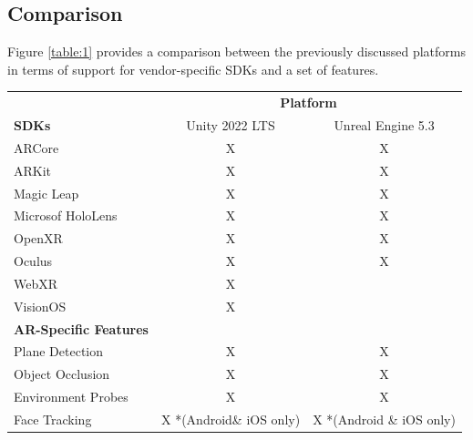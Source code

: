 \documentclass{vgtc}                          %
\begin{document}
\subsection{Comparison}
Figure \ref{table:1} provides a comparison between the previously discussed
platforms in terms of support for vendor-specific SDKs and a set of features.
\begin{table}
	\centering

	\begin{tabular}{l c c}
		\toprule
		                              & \multicolumn{2}{c}{\textbf{Platform}}                            \\
		\cmidrule(l){2-3}
		\textbf{SDKs}                 & Unity 2022 LTS                        & Unreal Engine 5.3        \\
		\midrule
		ARCore                        & X                                     & X                        \\
		ARKit                         & X                                     & X                        \\
		Magic Leap                    & X                                     & X                        \\
		Microsof HoloLens             & X                                     & X                        \\
		OpenXR                        & X                                     & X                        \\
		Oculus                        & X                                     & X                        \\
		WebXR                         & X                                     &                          \\
		VisionOS                      & X                                     &                          \\
		\midrule
		\textbf{AR-Specific Features} &                                       &                          \\
		\midrule
		Plane Detection               & X                                     & X                        \\
		Object Occlusion              & X                                     & X                        \\
		Environment Probes            & X                                     & X                        \\
		Face Tracking                 & X *(Android\& iOS only)               & X *(Android \& iOS only) \\

\end{tabular}
\end{table}
\end{document}
